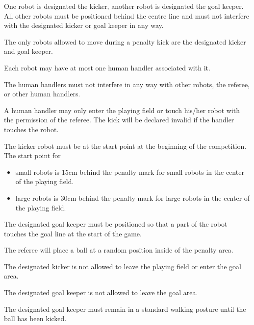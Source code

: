 \documentclass[12pt]{hurocup}
\begin{document}
\begin{lawlist}[PK]

\item One robot is designated the kicker, another robot is designated
the goal keeper. All other robots must be positioned behind the centre
line and must not interfere with the designated kicker or goal keeper
in any way.

\item The only robots allowed to move during a penalty kick are the
  designated kicker and goal keeper.

\item Each robot may have at most one human handler associated with
  it. 

\item \label{rd-handler1} The human handlers must not interfere in any
  way with other robots, the referee, or other human handlers.

\item \label{rd-handler2} A human handler may only enter the playing
  field or touch his/her robot with the permission of the referee.
  The kick will be declared invalid if the handler touches the robot.

\item The kicker robot must be at the start point at the beginning of
the competition. The start point for
  \begin{itemize}
  \item small robots is 15cm behind the penalty mark for small robots
    in the center of the playing field.
    \item large robots is 30cm behind the penalty mark for large
      robots in the center of the playing field.
    \end{itemize}

\item The designated goal keeper must be positioned so that a part of
 the robot touches the goal line at the start of the game.

\item The referee will place a ball at a random position inside of the
 penalty area. 

\item The designated kicker is not allowed to leave the playing field
 or enter the goal area.

\item The designated goal keeper is not allowed to leave the goal
area.

\item The designated goal keeper must remain in a standard walking
posture until the ball has been kicked.


\end{lawlist}
\end{document}

